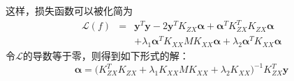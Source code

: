 这样，损失函数可以被化简为
\begin{eqnarray*}
\mathcal{L}(f)&=&\textbf{y}^T \textbf{y} - 2 \textbf{y}^T K_{ZX}
\pmb{\alpha} + \pmb{\alpha}^T K_{ZX}^T K_{ZX} \pmb{\alpha}\\
&& + \lambda_1 \pmb{\alpha}^T K_{XX} M K_{XX} \pmb{\alpha} +
\lambda_2 \pmb{\alpha}^T K_{XX} \pmb{\alpha}
\end{eqnarray*}
令$\mathcal{L}$的导数等于零，则得到如下形式的解：
\begin{equation}
\label{eqn:kernel-regression-sol} \pmb{\alpha}=\big( K_{ZX}^T K_{ZX}
+ \lambda_1 K_{XX}M K_{XX} + \lambda_2 K_{XX} \big)^{-1} K_{ZX}^T
\textbf{y}
\end{equation}

